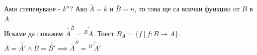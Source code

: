 \documentclass[fleqn, titlepage, 12pt]{report}
\begin{document}
 Ами степенуване - $k^n$? Ако $\overline{\overline{A}} = k$ и $\overline{\overline{B}} = n$, то това ще са всички функции от $B$ в $A$. \\
Искаме да покажем $\overline{\overline{A}}^{\overline{\overline{B}}} = \overline{\overline{^B A}}$.
Тоест $B_A = \{f\ |\ f: B \rightarrow A\}$.\\
$\overline{\overline{A}} = \overline{\overline{A'}} \land \overline{\overline{B}} = \overline{\overline{B'}} \implies
\overline{\overline{A}}^{\overline{\overline{B}}} = \overline{\overline{^{B'} A'}}$\\
\end{document}
